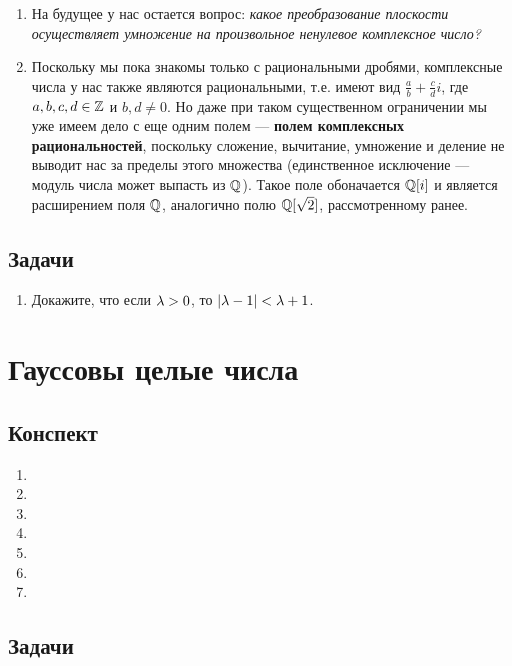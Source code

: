 \begin{enumerate}
\item На будущее у нас остается вопрос: \textit{какое преобразование плоскости осуществляет умножение на произвольное ненулевое комплексное число?}
\item Поскольку мы пока знакомы только с рациональными дробями, комплексные числа у нас также являются рациональными, т.е. имеют вид $\frac{a}{b}+\frac{c}{d}i$, где $a,b,c,d\in\mathbb Z$ и $b,d\ne 0$. Но даже при таком существенном ограничении мы уже имеем дело с еще одним полем --- \textbf{полем комплексных рациональностей}, поскольку сложение, вычитание, умножение и деление не выводит нас за пределы этого множества (единственное исключение --- модуль числа может выпасть из $\mathbb Q$). Такое поле обоначается $\mathbb Q[i]$ и является расширением поля $\mathbb Q$, аналогично полю $\mathbb Q[\sqrt 2]$, рассмотренному ранее.
\end{enumerate}

\subsection*{Задачи}

\begin{enumerate}
\item Докажите, что если $\lambda>0$, то $|\lambda-1|<\lambda+1$.
\end{enumerate}


\section{Гауссовы целые числа}

\subsection*{Конспект}

\begin{enumerate}
\item 
\item 
\item 
\item 
\item 
\item 
\item 
\end{enumerate}

\subsection*{Задачи}


